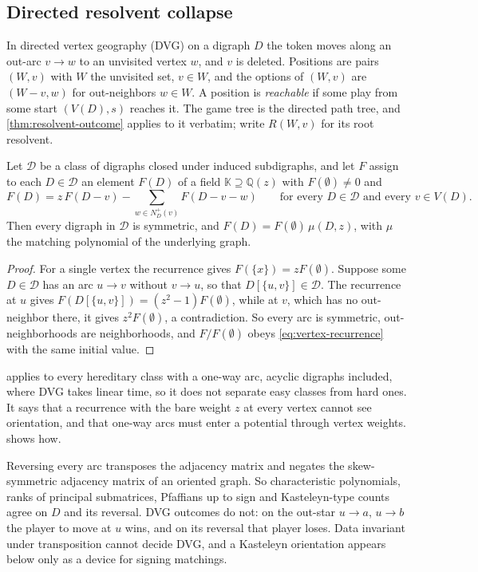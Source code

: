 \documentclass[final]{siamart0516}
\numberwithin{theorem}{section}
\numberwithin{equation}{section}
\theoremstyle{siamnonum}
\theoremstyle{plain}
\newcommand{\QQ}{\mathbb{Q}}
\newcommand{\Qz}{\QQ(z)}
\newcommand{\nplus}{N^{+}}
\begin{document}
\subsection{Directed resolvent collapse}\label{ssec:directed}
In directed vertex geography (DVG) on a digraph $D$ the token moves along an out-arc $v\to w$ to an unvisited vertex $w$, and $v$ is deleted. Positions are pairs $(W,v)$ with $W$ the unvisited set, $v\in W$, and the options of $(W,v)$ are $(W-v,w)$ for out-neighbors $w\in W$. A position is \emph{reachable} if some play from some start $(V(D),s)$ reaches it. The game tree is the directed path tree, and \cref{thm:resolvent-outcome} applies to it verbatim; write $R(W,v)$ for its root resolvent.

\begin{theorem}\label{thm:unweighted}
Let $\mathcal D$ be a class of digraphs closed under induced subdigraphs, and let $F$ assign to each $D\in\mathcal D$ an element $F(D)$ of a field $\mathbb K\supseteq\Qz$ with $F(\emptyset)\ne0$ and
\[
F(D)=z\,F(D-v)-\sum_{w\in\nplus_D(v)}F(D-v-w)\qquad\text{for every }D\in\mathcal D\text{ and every }v\in V(D).
\]
Then every digraph in $\mathcal D$ is symmetric, and $F(D)=F(\emptyset)\,\mu(D,z)$, with $\mu$ the matching polynomial of the underlying graph.
\end{theorem}
\begin{proof}
For a single vertex the recurrence gives $F(\{x\})=zF(\emptyset)$. Suppose some $D\in\mathcal D$ has an arc $u\to v$ without $v\to u$, so that $D[\{u,v\}]\in\mathcal D$. The recurrence at $u$ gives $F(D[\{u,v\}])=(z^2-1)F(\emptyset)$, while at $v$, which has no out-neighbor there, it gives $z^2F(\emptyset)$, a contradiction. So every arc is symmetric, out-neighborhoods are neighborhoods, and $F/F(\emptyset)$ obeys \eqref{eq:vertex-recurrence} with the same initial value.
\end{proof}

 applies to every hereditary class with a one-way arc, acyclic digraphs included, where DVG takes linear time, so it does not separate easy classes from hard ones. It says that a recurrence with the bare weight $z$ at every vertex cannot see orientation, and that one-way arcs must enter a potential through vertex weights.  shows how.

\begin{remark}\label{rem:transposition}
Reversing every arc transposes the adjacency matrix and negates the skew-symmetric adjacency matrix of an oriented graph. So characteristic polynomials, ranks of principal submatrices, Pfaffians up to sign and Kasteleyn-type counts agree on $D$ and its reversal. DVG outcomes do not: on the out-star $u\to a$, $u\to b$ the player to move at $u$ wins, and on its reversal that player loses. Data invariant under transposition cannot decide DVG, and a Kasteleyn orientation appears below only as a device for signing matchings.
\end{remark}
\end{document}
